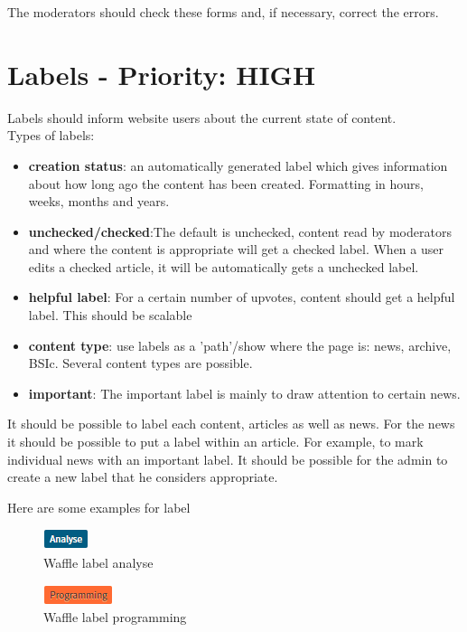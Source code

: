 The moderators should check these forms and, if necessary, correct the errors.


\section{Labels - Priority: HIGH}
 
\begin{tcolorbox}[breakable,colback=red!14,colframe=red!40!black,title=UPDATE 30/11/2017]
Labels should inform website users about the current state of content. 
\\
Types of labels:
\begin{itemize}
    \item \textbf{creation status}: an automatically generated label which gives information about how long ago the content has been created. Formatting in hours, weeks, months and years.
    \item \textbf{unchecked/checked}:The default is unchecked, content read by moderators and where the content is appropriate will get a checked label. When a user edits a checked article, it will be automatically gets a unchecked label. 
    \item \textbf{helpful label}: For a certain number of upvotes, content should get a helpful label. This should be scalable
    \item \textbf{content type}: use labels as a 'path'/show where the page is: news, archive, BSIc. Several content types are possible.
    \item \textbf{important}: The important label is mainly to draw attention to certain news.
\end{itemize}

It should be possible to label each content, articles as well as news. For the news it should be possible to put a label within an article. For example, to mark individual news with an important label. It should be possible for the admin to create a new label that he considers appropriate.


\end{tcolorbox}

Here are some examples for label
\begin{figure}[h] 
    \centering
    \includegraphics[scale=1.0]{Pictures/label1}
    \caption{Waffle label analyse}
\end{figure} 
\begin{figure}[h] 
    \centering
    \includegraphics[scale=1.0]{Pictures/label2}
    \caption{Waffle label programming}
\end{figure}

